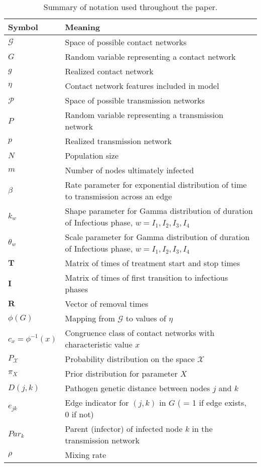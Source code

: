 \begin{table}
\centering
\doublespacing
\begin{tabular}{ll}
Symbol & Meaning \\ \hline
$\mathcal{G}$ & Space of possible contact networks \\
$G$ & Random variable representing a contact network \\
$g$ & Realized contact network \\
$\eta$ & Contact network features included in model \\
$\mathcal{P}$ & Space of possible transmission networks \\
$P$ & Random variable representing a transmission network \\
$p$ & Realized transmission network \\
$N$ & Population size \\
$m$ & Number of nodes ultimately infected \\
$\beta$ & Rate parameter for exponential distribution of time to transmission across an edge \\
$k_w$ & Shape parameter for Gamma distribution of duration of Infectious phase, $w=I_1, I_2, I_3, I_4$ \\
$\theta_w$ & Scale parameter for Gamma distribution of duration of Infectious phase, $w=I_1, I_2, I_3, I_4$ \\
$\mathbf{T}$ & Matrix of times of treatment start and stop times \\
$\mathbf{I}$ & Matrix of times of first transition to infectious phases \\
$\mathbf{R}$ & Vector of removal times \\
$\phi(G)$ & Mapping from $\mathcal{G}$ to values of $\eta$ \\
$c_x = \phi^{-1}(x)$ & Congruence class of contact networks with characteristic value $x$\\
$P_{\mathcal{X}}$ & Probability distribution on the space $\mathcal{X}$ \\
$\pi_X$ & Prior distribution for parameter $X$ \\
$D(j,k)$ & Pathogen genetic distance between nodes $j$ and $k$ \\
$e_{jk}$ & Edge indicator for $(j, k)$ in $G$ ( = 1 if edge exists, 0 if not) \\
$Par_k$ & Parent (infector) of infected node $k$ in the transmission network \\
$\rho$ & Mixing rate \\
\end{tabular}
\caption{Summary of notation used throughout the paper.}
\label{tab:notation}
\end{table}
